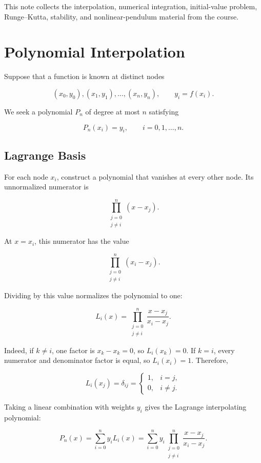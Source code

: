 \documentclass[12pt, a4paper]{article}
\theoremstyle{break}
\begin{document}
This note collects the interpolation, numerical integration, initial-value problem, Runge--Kutta, stability, and nonlinear-pendulum material from the course.

\section{Polynomial Interpolation}\label{polynomial-interpolation}

Suppose that a function is known at distinct nodes

\[
(x_0,y_0),(x_1,y_1),\ldots,(x_n,y_n), \qquad y_i=f(x_i).
\]

We seek a polynomial \(P_n\) of degree at most \(n\) satisfying

\[
P_n(x_i)=y_i, \qquad i=0,1,\ldots,n.
\]

\subsection{Lagrange Basis}\label{lagrange-basis}

For each node \(x_i\), construct a polynomial that vanishes at every other node. Its unnormalized numerator is

\[
\prod_{\substack{j=0\\j\ne i}}^n (x-x_j).
\]

At \(x=x_i\), this numerator has the value

\[
\prod_{\substack{j=0\\j\ne i}}^n (x_i-x_j).
\]

Dividing by this value normalizes the polynomial to one:

\[
L_i(x)=\prod_{\substack{j=0\\j\ne i}}^n
\frac{x-x_j}{x_i-x_j}.
\]

Indeed, if \(k\ne i\), one factor is \(x_k-x_k=0\), so \(L_i(x_k)=0\). If \(k=i\), every numerator and denominator factor is equal, so \(L_i(x_i)=1\). Therefore,

\[
L_i(x_j)=\delta_{ij}=\begin{cases}1,&i=j,\\0,&i\ne j.\end{cases}
\]

Taking a linear combination with weights \(y_i\) gives the Lagrange interpolating polynomial:

\[
P_n(x)=\sum_{i=0}^n y_iL_i(x)
=\sum_{i=0}^n y_i\prod_{\substack{j=0\\j\ne i}}^n
\frac{x-x_j}{x_i-x_j}.
\]
\end{document}
